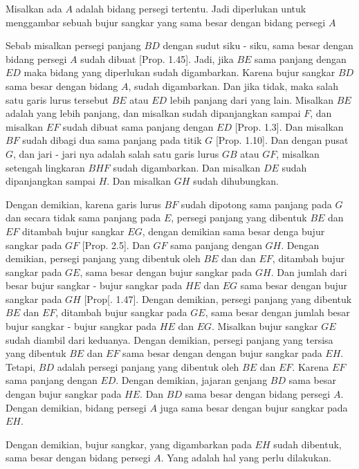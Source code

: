 \documentclass[a4paper]{book}
\begin{document}
Misalkan ada $A$ adalah bidang persegi tertentu. Jadi diperlukan untuk
menggambar sebuah bujur sangkar yang sama besar dengan bidang persegi
$A$

Sebab misalkan persegi panjang $BD$ dengan sudut siku - siku, sama besar  
dengan bidang persegi $A$ sudah dibuat [Prop. 1.45]. Jadi,
jika $BE$  sama panjang dengan $ED$ maka bidang yang diperlukan sudah 
digambarkan. Karena bujur sangkar $BD$ sama besar dengan bidang $A$, sudah
digambarkan. Dan jika tidak, maka salah satu garis lurus tersebut $BE$ 
atau $ED$ lebih panjang dari yang lain. Misalkan $BE$ adalah yang lebih
panjang, dan misalkan sudah dipanjangkan sampai $F$, dan misalkan $EF$ 
sudah dibuat sama panjang dengan $ED$ [Prop. 1.3]. Dan misalkan $BF$ sudah
dibagi dua sama panjang pada titik $G$ [Prop. 1.10]. Dan dengan pusat $G$, 
dan jari - jari nya adalah salah satu garis lurus $GB$ atau $GF$, misalkan
setengah lingkaran $BHF$ sudah digambarkan. Dan misalkan $DE$ sudah 
dipanjangkan sampai $H$. Dan misalkan $GH$ sudah dihubungkan.

Dengan demikian, karena garis lurus $BF$ sudah dipotong sama panjang pada
$G$ dan secara tidak sama panjang pada $E$, persegi panjang yang dibentuk
$BE$ dan $EF$ ditambah bujur sangkar $EG$, dengan demikian sama besar denga
bujur sangkar pada $GF$ [Prop. 2.5]. Dan $GF$ sama panjang dengan $GH$. 
Dengan demikian, persegi panjang yang dibentuk oleh $BE$ dan dan $EF$, 
ditambah bujur sangkar pada $GE$, sama besar dengan bujur sangkar pada
$GH$. Dan jumlah dari besar bujur sangkar - bujur sangkar pada $HE$ dan $EG$
sama besar dengan bujur sangkar pada $GH$ [Prop[. 1.47]. Dengan demikian, 
persegi panjang yang dibentuk $BE$ dan $EF$, ditambah bujur sangkar pada $GE$,
sama besar dengan jumlah besar bujur sangkar - bujur sangkar pada $HE$ dan
$EG$. Misalkan bujur sangkar $GE$ sudah diambil dari keduanya. Dengan demikian, 
persegi panjang yang tersisa yang dibentuk $BE$ dan $EF$ sama besar dengan 
dengan bujur sangkar pada $EH$. Tetapi, $BD$ adalah persegi panjang yang 
dibentuk oleh $BE$ dan $EF$. Karena $EF$ sama panjang dengan $ED$. Dengan 
demikian, jajaran genjang $BD$ sama besar dengan  bujur sangkar pada $HE$.
Dan $BD$ sama besar dengan bidang persegi $A$. Dengan demikian, bidang
persegi $A$ juga sama besar dengan bujur sangkar pada $EH$.

Dengan demikian, bujur sangkar, yang digambarkan pada $EH$ sudah dibentuk, 
sama besar dengan bidang persegi $A$. Yang adalah hal yang perlu dilakukan.  

\end{document}
